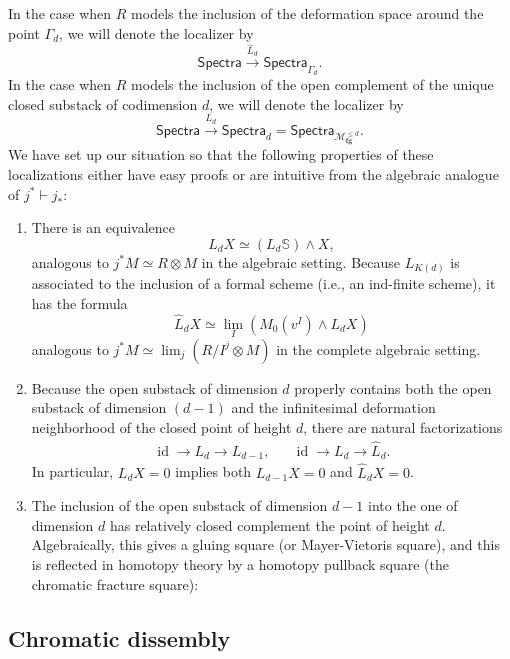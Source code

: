 \documentclass{amsart}
\renewcommand{\S}{\mathbb S}
\newcommand{\<}{\langle}
\renewcommand{\>}{\rangle}
\newcommand{\sm}{\wedge}
\newcommand{\CatOf}[1]{\mathsf{#1}}
\newcommand{\moduli}[1]{\mathcal{M}_{\mathbf{#1}}}
\theoremstyle{plain}
\theoremstyle{definition}
\theoremstyle{remark}
\begin{document}
In the case when $R$ models the inclusion of the deformation space around the point $\Gamma_d$, we will denote the localizer by \[\CatOf{Spectra} \xrightarrow{\widehat L_d} \CatOf{Spectra}_{\Gamma_d}.\]  In the case when $R$ models the inclusion of the open complement of the unique closed substack of codimension $d$, we will denote the localizer by \[\CatOf{Spectra} \xrightarrow{L_d} \CatOf{Spectra}_d = \CatOf{Spectra}_{\moduli{fg}^{\le d}}.\]  We have set up our situation so that the following properties of these localizations either have easy proofs or are intuitive from the algebraic analogue of $j^* \vdash j_*$:
\begin{enumerate}
\item There is an equivalence \[L_d X \simeq (L_d \S) \sm X,\] analogous to $j^* M \simeq R \otimes M$ in the algebraic setting.  Because $L_{K(d)}$ is associated to the inclusion of a formal scheme (i.e., an ind-finite scheme), it has the formula \[\widehat L_d X \simeq \lim_I \left( M_0(v^I) \sm L_d X \right)\] analogous to $j^* M \simeq \lim_j (R/I^j \otimes M)$ in the complete algebraic setting.
\item Because the open substack of dimension $d$ properly contains both the open substack of dimension $(d-1)$ and the infinitesimal deformation neighborhood of the closed point of height $d$, there are natural factorizations
\begin{align*}
\operatorname{id} \to L_d \to L_{d-1}, & & \operatorname{id} \to L_d \to \widehat L_d.
\end{align*}
In particular, $L_d X = 0$ implies both $L_{d-1} X = 0$ and $\widehat L_d X = 0$.
\item The inclusion of the open substack of dimension $d-1$ into the one of dimension $d$ has relatively closed complement the point of height $d$.  Algebraically, this gives a gluing square (or Mayer-Vietoris square), and this is reflected in homotopy theory by a homotopy pullback square (the chromatic fracture square):
\begin{center}
\end{center}
\end{enumerate}


\subsection{Chromatic dissembly}
\end{document}
